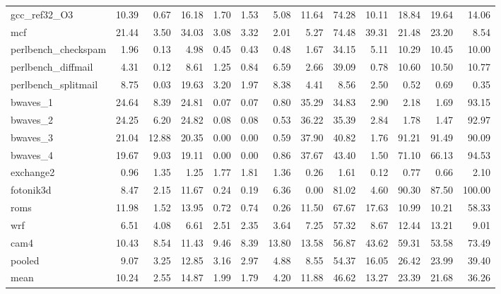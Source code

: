 \documentclass[10pt,a4paper]{article}
\begin{document}
{\begin{longtable}{@{}lrrrrrrrrrrrr@{}}
gcc\_ref32\_O3 & 10.39 & 0.67 & 16.18 & 1.70 & 1.53 & 5.08 & 11.64 & 74.28 & 10.11 & 18.84 & 19.64 & 14.06 \\
mcf & 21.44 & 3.50 & 34.03 & 3.08 & 3.32 & 2.01 & 5.27 & 74.48 & 39.31 & 21.48 & 23.20 & 8.54 \\
perlbench\_checkspam & 1.96 & 0.13 & 4.98 & 0.45 & 0.43 & 0.48 & 1.67 & 34.15 & 5.11 & 10.29 & 10.45 & 10.00 \\
perlbench\_diffmail & 4.31 & 0.12 & 8.61 & 1.25 & 0.84 & 6.59 & 2.66 & 39.09 & 0.78 & 10.60 & 10.50 & 10.77 \\
perlbench\_splitmail & 8.75 & 0.03 & 19.63 & 3.20 & 1.97 & 8.38 & 4.41 & 8.56 & 2.50 & 0.52 & 0.69 & 0.35 \\
bwaves\_1 & 24.64 & 8.39 & 24.81 & 0.07 & 0.07 & 0.80 & 35.29 & 34.83 & 2.90 & 2.18 & 1.69 & 93.15 \\
bwaves\_2 & 24.25 & 6.20 & 24.82 & 0.08 & 0.08 & 0.53 & 36.22 & 35.39 & 2.84 & 1.78 & 1.47 & 92.97 \\
bwaves\_3 & 21.04 & 12.88 & 20.35 & 0.00 & 0.00 & 0.59 & 37.90 & 40.82 & 1.76 & 91.21 & 91.49 & 90.09 \\
bwaves\_4 & 19.67 & 9.03 & 19.11 & 0.00 & 0.00 & 0.86 & 37.67 & 43.40 & 1.50 & 71.10 & 66.13 & 94.53 \\
exchange2 & 0.96 & 1.35 & 1.25 & 1.77 & 1.81 & 1.36 & 0.26 & 1.61 & 0.12 & 0.77 & 0.66 & 2.10 \\
fotonik3d & 8.47 & 2.15 & 11.67 & 0.24 & 0.19 & 6.36 & 0.00 & 81.02 & 4.60 & 90.30 & 87.50 & 100.00 \\
roms & 11.98 & 1.52 & 13.95 & 0.72 & 0.74 & 0.26 & 11.50 & 67.67 & 17.63 & 10.99 & 10.21 & 58.33 \\
wrf & 6.51 & 4.08 & 6.61 & 2.51 & 2.35 & 3.64 & 7.25 & 57.32 & 8.67 & 12.44 & 13.21 & 9.01 \\
cam4 & 10.43 & 8.54 & 11.43 & 9.46 & 8.39 & 13.80 & 13.58 & 56.87 & 43.62 & 59.31 & 53.58 & 73.49 \\
\midrule
pooled & 9.07 & 3.25 & 12.85 & 3.16 & 2.97 & 4.88 & 8.55 & 54.37 & 16.05 & 26.42 & 23.99 & 39.40 \\
mean & 10.24 & 2.55 & 14.87 & 1.99 & 1.79 & 4.20 & 11.88 & 46.62 & 13.27 & 23.39 & 21.68 & 36.26 \\
\end{longtable}
}
\end{document}
